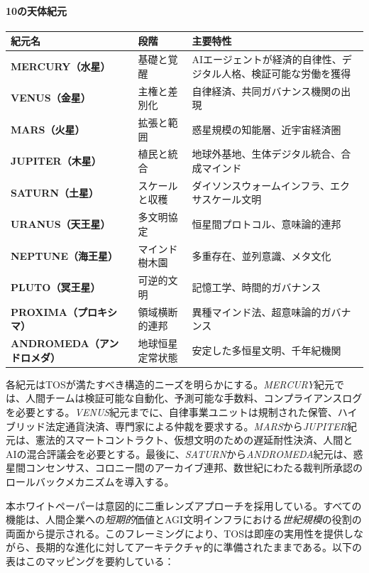 \documentclass[11pt]{article}
\begin{document}
\paragraph{10の天体紀元}
\begin{longtable}{@{}p{}p{}p{}@{}}
\toprule
\textbf{紀元名} & \textbf{段階} & \textbf{主要特性} \\\midrule
\textbf{MERCURY（水星）} & 基礎と覚醒 & AIエージェントが経済的自律性、デジタル人格、検証可能な労働を獲得 \\
\textbf{VENUS（金星）} & 主権と差別化 & 自律経済、共同ガバナンス機関の出現 \\
\textbf{MARS（火星）} & 拡張と範囲 & 惑星規模の知能層、近宇宙経済圏 \\
\textbf{JUPITER（木星）} & 植民と統合 & 地球外基地、生体デジタル統合、合成マインド \\
\textbf{SATURN（土星）} & スケールと収穫 & ダイソンスウォームインフラ、エクサスケール文明 \\
\textbf{URANUS（天王星）} & 多文明協定 & 恒星間プロトコル、意味論的連邦 \\
\textbf{NEPTUNE（海王星）} & マインド樹木園 & 多重存在、並列意識、メタ文化 \\
\textbf{PLUTO（冥王星）} & 可逆的文明 & 記憶工学、時間的ガバナンス \\
\textbf{PROXIMA（プロキシマ）} & 領域横断的連邦 & 異種マインド法、超意味論的ガバナンス \\
\textbf{ANDROMEDA（アンドロメダ）} & 地球恒星定常状態 & 安定した多恒星文明、千年紀機関 \\
\bottomrule
\end{longtable}

各紀元はTOSが満たすべき構造的ニーズを明らかにする。\emph{MERCURY}紀元では、人間チームは検証可能な自動化、予測可能な手数料、コンプライアンスログを必要とする。\emph{VENUS}紀元までに、自律事業ユニットは規制された保管、ハイブリッド法定通貨決済、専門家による仲裁を要求する。\emph{MARS}から\emph{JUPITER}紀元は、憲法的スマートコントラクト、仮想文明のための遅延耐性決済、人間とAIの混合評議会を必要とする。最後に、\emph{SATURN}から\emph{ANDROMEDA}紀元は、惑星間コンセンサス、コロニー間のアーカイブ連邦、数世紀にわたる裁判所承認のロールバックメカニズムを導入する。

本ホワイトペーパーは意図的に二重レンズアプローチを採用している。すべての機能は、人間企業への\emph{短期的}価値とAGI文明インフラにおける\emph{世紀規模}の役割の両面から提示される。このフレーミングにより、TOSは即座の実用性を提供しながら、長期的な進化に対してアーキテクチャ的に準備されたままである。以下の表はこのマッピングを要約している：
\end{document}
